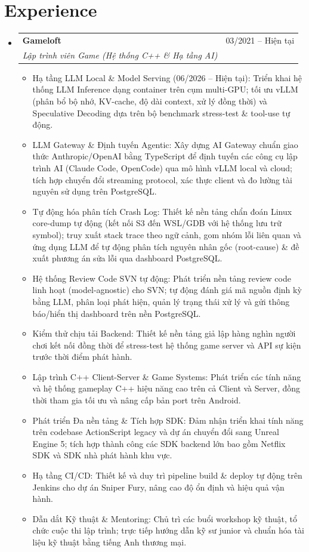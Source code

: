\documentclass[letterpaper,10pt]{article}
\makeatletter
\newcommand{\resumeItem}[1]{
  \item\small{
    {#1 \vspace{-2pt}}
  }
}
\newcommand{\resumeSubheading}[4]{
  \vspace{1pt}\item
    \begin{tabular*}{0.97\textwidth}[t]{l@{\extracolsep{\fill}}r}
      \textbf{#1} & #2 \\
      \textit{\small#3} & \textit{\small #4} \\
    \end{tabular*}\vspace{-2pt}
}
\newcommand{\resumeSubHeadingListStart}{\begin{itemize}[leftmargin=0.15in, label={}, itemsep=2pt]}
\newcommand{\resumeSubHeadingListEnd}{\end{itemize}\vspace{2pt}}
\newcommand{\resumeItemListStart}{\begin{itemize}[itemsep=3pt, parsep=2pt, topsep=3pt]}
\newcommand{\resumeItemListEnd}{\end{itemize}\vspace{2pt}}
\makeatother
\begin{document}
\section{Experience}
  \resumeSubHeadingListStart
    \resumeSubheading
      {Gameloft}{03/2021 -- Hiện tại}
      {Lập trình viên Game (Hệ thống C++ \& Hạ tầng AI)}{}
      \resumeItemListStart
                \resumeItem{Hạ tầng LLM Local \& Model Serving (06/2026 – Hiện tại): Triển khai hệ thống LLM Inference dạng container trên cụm multi-GPU; tối ưu vLLM (phân bổ bộ nhớ, KV-cache, độ dài context, xử lý đồng thời) và Speculative Decoding dựa trên bộ benchmark stress-test \& tool-use tự động.}
        \resumeItem{LLM Gateway \& Định tuyến Agentic: Xây dựng AI Gateway chuẩn giao thức Anthropic/OpenAI bằng TypeScript để định tuyến các công cụ lập trình AI (Claude Code, OpenCode) qua mô hình vLLM local và cloud; tích hợp chuyển đổi streaming protocol, xác thực client và đo lường tài nguyên sử dụng trên PostgreSQL.}
        \resumeItem{Tự động hóa phân tích Crash Log: Thiết kế nền tảng chẩn đoán Linux core-dump tự động (kết nối S3 đến WSL/GDB với hệ thống lưu trữ symbol); truy xuất stack trace theo ngữ cảnh, gom nhóm lỗi liên quan và ứng dụng LLM để tự động phân tích nguyên nhân gốc (root-cause) \& đề xuất phương án sửa lỗi qua dashboard PostgreSQL.}
        \resumeItem{Hệ thống Review Code SVN tự động: Phát triển nền tảng review code linh hoạt (model-agnostic) cho SVN; tự động đánh giá mã nguồn định kỳ bằng LLM, phân loại phát hiện, quản lý trạng thái xử lý và gửi thông báo/hiển thị dashboard trên nền PostgreSQL.}
        \resumeItem{Kiểm thử chịu tải Backend: Thiết kế nền tảng giả lập hàng nghìn người chơi kết nối đồng thời để stress-test hệ thống game server và API sự kiện trước thời điểm phát hành.}
        \resumeItem{Lập trình C++ Client-Server \& Game Systems: Phát triển các tính năng và hệ thống gameplay C++ hiệu năng cao trên cả Client và Server, đồng thời tham gia tối ưu và nâng cấp bản port trên Android.}
        \resumeItem{Phát triển Đa nền tảng \& Tích hợp SDK: Đảm nhận triển khai tính năng trên codebase ActionScript legacy và dự án chuyển đổi sang Unreal Engine 5; tích hợp thành công các SDK backend lớn bao gồm Netflix SDK và SDK nhà phát hành khu vực.}
        \resumeItem{Hạ tầng CI/CD: Thiết kế và duy trì pipeline build \& deploy tự động trên Jenkins cho dự án Sniper Fury, nâng cao độ ổn định và hiệu quả vận hành.}
        \resumeItem{Dẫn dắt Kỹ thuật \& Mentoring: Chủ trì các buổi workshop kỹ thuật, tổ chức cuộc thi lập trình; trực tiếp hướng dẫn kỹ sư junior và chuẩn hóa tài liệu kỹ thuật bằng tiếng Anh thương mại.}
      \resumeItemListEnd
  \resumeSubHeadingListEnd
\end{document}
